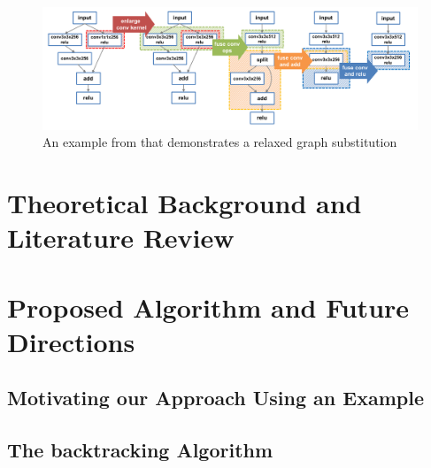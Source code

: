 \documentclass[10pt a4paper twoside]{report}
\begin{document}
\begin{figure}[b!]
	\begin{center}
		\includegraphics[scale=0.3]{resnetExample}
	\end{center}	
	\caption{An example from \cite{jia2019} that demonstrates a relaxed graph substitution}
	\label{resnet}
\end{figure}


\chapter{Theoretical Background and Literature Review}



\chapter{Proposed Algorithm and Future Directions}

	\section{Motivating our Approach Using an Example}

	\section{The backtracking Algorithm}
\end{document}
